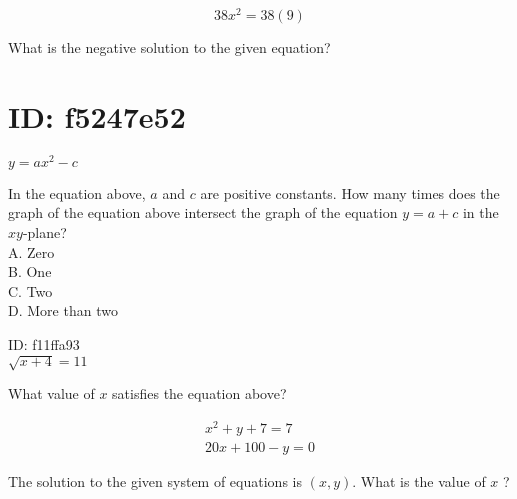 $$
38 x^{2}=38(9)
$$

What is the negative solution to the given equation?

\section*{ID: f5247e52}
$y=a x^{2}-c$

In the equation above, $a$ and $c$ are positive constants. How many times does the graph of the equation above intersect the graph of the equation $y=a+c$ in the $x y$-plane?\\
A. Zero\\
B. One\\
C. Two\\
D. More than two

ID: f11ffa93\\
$\sqrt{x+4}=11$

What value of $x$ satisfies the equation above?

$$
\begin{gathered}
x^{2}+y+7=7 \\
20 x+100-y=0
\end{gathered}
$$

The solution to the given system of equations is $(x, y)$. What is the value of $x$ ?


